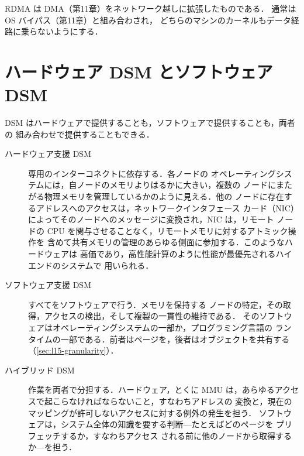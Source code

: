 \documentclass[../main.tex]{subfiles}
\begin{document}
RDMA は DMA（第11章）をネットワーク越しに拡張したものである．
通常は OS バイパス（第11章）と組み合わされ，
どちらのマシンのカーネルもデータ経路に乗らないようにする．

\section{ハードウェア DSM とソフトウェア DSM}
\label{sec:l15-hwsw}

DSM はハードウェアで提供することも，ソフトウェアで提供することも，両者の
組み合わせで提供することもできる．
\begin{description}
  \item[ハードウェア支援 DSM] 専用のインターコネクトに依存する．各ノードの
    オペレーティングシステムには，自ノードのメモリよりはるかに大きい，複数の
    ノードにまたがる物理メモリを管理しているかのように見える．他の
    ノードに存在するアドレスへのアクセスは，ネットワークインタフェース
    カード（NIC）によってそのノードへのメッセージに変換され，NIC は，リモート
    ノードの CPU を関与させることなく，リモートメモリに対するアトミック操作を
    含めて共有メモリの管理のあらゆる側面に参加する．このようなハードウェアは
    高価であり，高性能計算のように性能が最優先されるハイエンドのシステムで
    用いられる．
  \item[ソフトウェア支援 DSM] すべてをソフトウェアで行う．メモリを保持する
    ノードの特定，その取得，アクセスの検出，そして複製の一貫性の維持である．
    そのソフトウェアはオペレーティングシステムの一部か，プログラミング言語の
    ランタイムの一部である．前者はページを，後者はオブジェクトを共有する
    （\cref{sec:l15-granularity}）．
  \item[ハイブリッド DSM] 作業を両者で分担する．ハードウェア，とくに MMU
    は，あらゆるアクセスで起こらなければならないこと，すなわちアドレスの
    変換と，現在のマッピングが許可しないアクセスに対する例外の発生を担う．
    ソフトウェアは，システム全体の知識を要する判断---たとえばどのページを
    プリフェッチするか，すなわちアクセス
    される前に他のノードから取得するか---を担う．
\end{description}
\end{document}

